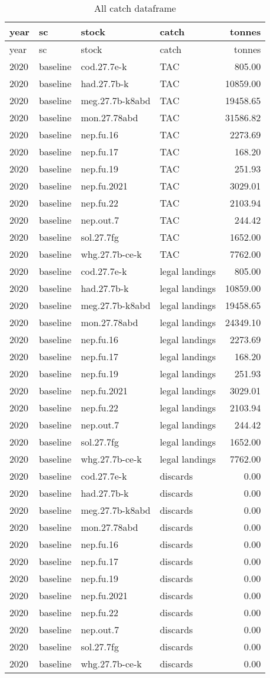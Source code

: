 \documentclass[
]{article}
\begin{document}
\begin{longtable}[]{@{}llllr@{}}
\caption{All catch dataframe}\tabularnewline
\toprule
year & sc & stock & catch & tonnes\tabularnewline
\midrule
\endfirsthead
\toprule
year & sc & stock & catch & tonnes\tabularnewline
\midrule
\endhead
2020 & baseline & cod.27.7e-k & TAC & 805.00\tabularnewline
2020 & baseline & had.27.7b-k & TAC & 10859.00\tabularnewline
2020 & baseline & meg.27.7b-k8abd & TAC & 19458.65\tabularnewline
2020 & baseline & mon.27.78abd & TAC & 31586.82\tabularnewline
2020 & baseline & nep.fu.16 & TAC & 2273.69\tabularnewline
2020 & baseline & nep.fu.17 & TAC & 168.20\tabularnewline
2020 & baseline & nep.fu.19 & TAC & 251.93\tabularnewline
2020 & baseline & nep.fu.2021 & TAC & 3029.01\tabularnewline
2020 & baseline & nep.fu.22 & TAC & 2103.94\tabularnewline
2020 & baseline & nep.out.7 & TAC & 244.42\tabularnewline
2020 & baseline & sol.27.7fg & TAC & 1652.00\tabularnewline
2020 & baseline & whg.27.7b-ce-k & TAC & 7762.00\tabularnewline
2020 & baseline & cod.27.7e-k & legal landings & 805.00\tabularnewline
2020 & baseline & had.27.7b-k & legal landings & 10859.00\tabularnewline
2020 & baseline & meg.27.7b-k8abd & legal landings &
19458.65\tabularnewline
2020 & baseline & mon.27.78abd & legal landings &
24349.10\tabularnewline
2020 & baseline & nep.fu.16 & legal landings & 2273.69\tabularnewline
2020 & baseline & nep.fu.17 & legal landings & 168.20\tabularnewline
2020 & baseline & nep.fu.19 & legal landings & 251.93\tabularnewline
2020 & baseline & nep.fu.2021 & legal landings & 3029.01\tabularnewline
2020 & baseline & nep.fu.22 & legal landings & 2103.94\tabularnewline
2020 & baseline & nep.out.7 & legal landings & 244.42\tabularnewline
2020 & baseline & sol.27.7fg & legal landings & 1652.00\tabularnewline
2020 & baseline & whg.27.7b-ce-k & legal landings &
7762.00\tabularnewline
2020 & baseline & cod.27.7e-k & discards & 0.00\tabularnewline
2020 & baseline & had.27.7b-k & discards & 0.00\tabularnewline
2020 & baseline & meg.27.7b-k8abd & discards & 0.00\tabularnewline
2020 & baseline & mon.27.78abd & discards & 0.00\tabularnewline
2020 & baseline & nep.fu.16 & discards & 0.00\tabularnewline
2020 & baseline & nep.fu.17 & discards & 0.00\tabularnewline
2020 & baseline & nep.fu.19 & discards & 0.00\tabularnewline
2020 & baseline & nep.fu.2021 & discards & 0.00\tabularnewline
2020 & baseline & nep.fu.22 & discards & 0.00\tabularnewline
2020 & baseline & nep.out.7 & discards & 0.00\tabularnewline
2020 & baseline & sol.27.7fg & discards & 0.00\tabularnewline
2020 & baseline & whg.27.7b-ce-k & discards & 0.00\tabularnewline

\end{longtable}
\end{document}
